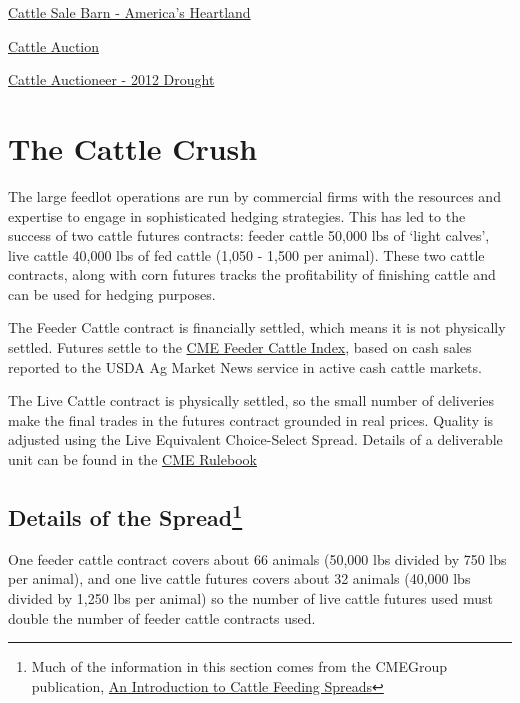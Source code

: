 \documentclass[]{book}
\let\rmarkdownfootnote\footnote%
\def\footnote{\protect\rmarkdownfootnote}
\theoremstyle{definition}
\theoremstyle{definition}
\theoremstyle{remark}
\begin{document}
\href{https://www.youtube.com/watch?v=m0iiTk3MQ3k}{Cattle Sale Barn -
America's Heartland}

\href{https://www.youtube.com/watch?v=ACKT5jWJHTI}{Cattle Auction}

\href{https://www.youtube.com/watch?v=Ig514nyWQho}{Cattle Auctioneer -
2012 Drought}

\section{The Cattle Crush}\label{the-cattle-crush}

The large feedlot operations are run by commercial firms with the
resources and expertise to engage in sophisticated hedging strategies.
This has led to the success of two cattle futures contracts: feeder
cattle 50,000 lbs of `light calves', live cattle 40,000 lbs of fed
cattle (1,050 - 1,500 per animal). These two cattle contracts, along
with corn futures tracks the profitability of finishing cattle and can
be used for hedging purposes.

The Feeder Cattle contract is financially settled, which means it is not
physically settled. Futures settle to the
\href{http://www.cmegroup.com/market-data/reports/cash-settled-commodity-index-prices.html}{CME
Feeder Cattle Index}, based on cash sales reported to the USDA Ag Market
News service in active cash cattle markets.

The Live Cattle contract is physically settled, so the small number of
deliveries make the final trades in the futures contract grounded in
real prices. Quality is adjusted using the Live Equivalent Choice-Select
Spread. Details of a deliverable unit can be found in the
\href{http://www.cmegroup.com/rulebook/CME/II/100/101/101.pdf}{CME
Rulebook}

\subsection[Details of the Spread]{\texorpdfstring{Details of the
Spread\footnote{Much of the information in this section comes from the
  CMEGroup publication,
  \href{http://www.cmegroup.com/trading/agricultural/files/AC-378_CattleFeedingWhitePaper_r2.pdf}{An
  Introduction to Cattle Feeding Spreads}}}{Details of the Spread}}\label{details-of-the-spreadcattlespread}

One feeder cattle contract covers about 66 animals (50,000 lbs divided
by 750 lbs per animal), and one live cattle futures covers about 32
animals (40,000 lbs divided by 1,250 lbs per animal) so the number of
live cattle futures used must double the number of feeder cattle
contracts used.
\end{document}
